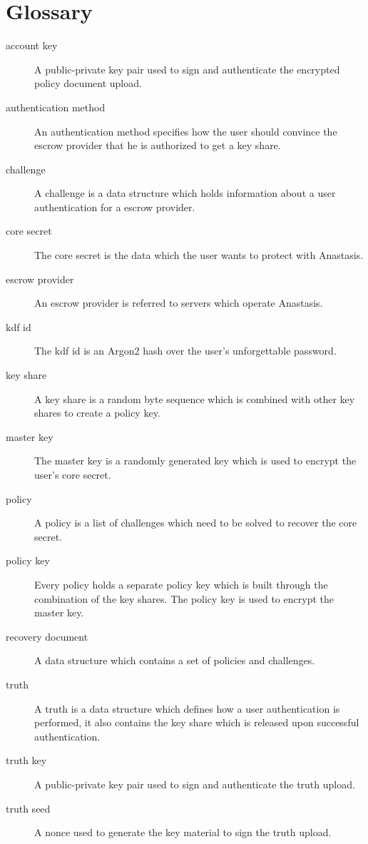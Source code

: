 \section*{Glossary}
\label{sec:glossary}
\begin{description}
	 \item[account key] {A public-private key pair used to sign and authenticate the encrypted policy document upload.}
	 \item[authentication method] {An authentication method specifies how the user should convince the escrow provider that he is authorized to get a key share.}
	 \item[challenge] {A challenge is a data structure which holds information about a user authentication for a escrow provider.}
 	\item[core secret] {The core secret is the data which the user wants to protect with Anastasis.}
 	\item[escrow provider] {An escrow provider is referred  to servers which operate Anastasis.}
 	\item[kdf id] {The kdf id is an Argon2 hash over the user's unforgettable password.}
 	\item[key share] {A key share is a random byte sequence which is combined with other key shares to create a policy key.}
 	\item[master key] {The master key is a randomly generated key which is used to encrypt the user's core secret.}
 	\item[policy] {A policy is a list of challenges which need to be solved to recover the core secret.}
 	\item[policy key] {Every policy holds a separate policy key which is built through the combination of the key shares. The policy key is used to encrypt the master key.}
	\item[recovery document] {A data structure which contains a set of policies and challenges.}
	\item[truth] {A truth is a data structure which defines how a user authentication is performed, it also contains the key share which is released upon successful authentication.}
	\item[truth key] {A public-private key pair used to sign and authenticate the truth upload.}
    \item[truth seed] {A nonce used to generate the key material to sign the truth upload.}
\end{description}
